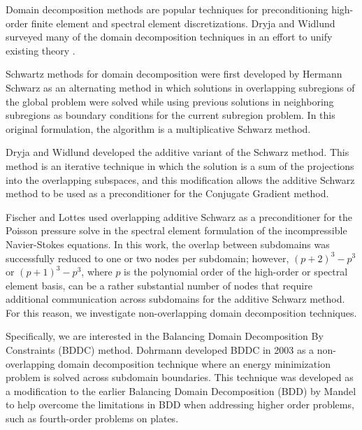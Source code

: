 Domain decomposition methods are popular techniques for preconditioning high-order finite element and spectral element discretizations.
Dryja and Widlund surveyed many of the domain decomposition techniques in an effort to unify existing theory \cite{dryja1989towards}.

Schwartz methods for domain decomposition were first developed by Hermann Schwarz \cite{schwarz1972gesammelte} as an alternating method in which solutions in overlapping subregions of the global problem were solved while using previous solutions in neighboring subregions as boundary conditions for the current subregion problem.
In this original formulation, the algorithm is a multiplicative Schwarz method.

Dryja and Widlund \cite{widlund1987additive,dryja1989additive} developed the additive variant of the Schwarz method.
This method is an iterative technique in which the solution is a sum of the projections into the overlapping subspaces, and this modification allows the additive Schwarz method to be used as a preconditioner for the Conjugate Gradient method.

Fischer and Lottes \cite{fischer1997overlapping,fischer2005hybrid} used overlapping additive Schwarz as a preconditioner for the Poisson pressure solve in the spectral element formulation of the incompressible Navier-Stokes equations.
In this work, the overlap between subdomains was successfully reduced to one or two nodes per subdomain; however, $\left( p + 2 \right)^3 - p^3$ or $\left( p + 1 \right)^3 - p^3$, where $p$ is the polynomial order of the high-order or spectral element basis, can be a rather substantial number of nodes that require additional communication across subdomains for the additive Schwarz method.
For this reason, we investigate non-overlapping domain decomposition techniques.

Specifically, we are interested in the Balancing Domain Decomposition By Constraints (BDDC) method.
Dohrmann \cite{dohrmann2003preconditioner} developed BDDC in 2003 as a non-overlapping domain decomposition technique where an energy minimization problem is solved across subdomain boundaries.
This technique was developed as a modification to the earlier Balancing Domain Decomposition (BDD) by Mandel \cite{mandel1993balancing} to help overcome the limitations in BDD when addressing higher order problems, such as fourth-order problems on plates.

